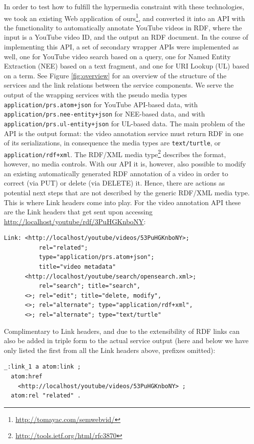 \documentclass{acm_proc_article-sp}
\begin{document}
In order to test how to fulfill the hypermedia constraint with these technologies, we took an existing Web application of ours\footnote{\url{http://tomayac.com/semwebvid/}}, and converted it into an API with the functionality to automatically annotate YouTube videos in RDF, where the input is a YouTube video ID, and the output an RDF document. In the course of implementing this API, a set of secondary wrapper APIs were implemented as well, one for YouTube video search based on a query, one for Named Entity Extraction (NEE) based on a text fragment, and one for URI Lookup (UL) based on a term. See Figure \ref{fig:overview} for an overview of the structure of the services and the link relations between the service components. We serve the output of the wrapping services with the pseudo media types \texttt{application/prs.atom+json} for YouTube API-based data, with \texttt{application/prs.nee-entity+json} for NEE-based data, and with \texttt{application/prs.ul-entity+json} for UL-based data. The main problem of the API is the output format: the video annotation service must return RDF in one of its serializations, in consequence the media types are \texttt{text/turtle}, or \texttt{application/rdf+xml}. The RDF/XML media type\footnote{\url{http://tools.ietf.org/html/rfc3870}} describes the format, however, no media controls. With our API it is, however, also possible to modify an existing automatically generated RDF annotation of a video in order to correct (via PUT) or delete (via DELETE) it. Hence, there are actions as potential next steps that are not described by the generic RDF/XML media type. This is where Link headers come into play. For the video annotation API these are the Link headers that get sent upon accessing \url{http://localhost/youtube/rdf/3PuHGKnboNY}:
\begin{verbatim}
Link: <http://localhost/youtube/videos/53PuHGKnboNY>;
          rel="related";
          type="application/prs.atom+json";
          title="video metadata"
      <http://localhost/youtube/search/opensearch.xml>;
          rel="search"; title="search",
      <>; rel="edit"; title="delete, modify",
      <>; rel="alternate"; type="application/rdf+xml",
      <>; rel="alternate"; type="text/turtle"   
\end{verbatim}
Complimentary to Link headers, and due to the extensibility of RDF links can also be added in triple form to the actual service output (here and below we have only listed the first from all the Link headers above, prefixes omitted):
\begin{verbatim}
_:link_1 a atom:link ;
  atom:href
    <http://localhost/youtube/videos/53PuHGKnboNY> ;
  atom:rel "related" .
\end{verbatim}
\end{document}

